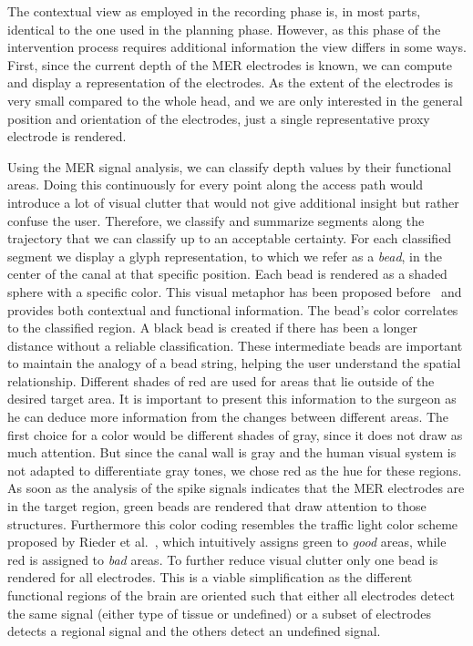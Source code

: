 \documentclass[review]{vgtc}                 %
\begin{document}
The contextual view as employed in the recording phase is, in most parts, identical to the one used in the planning phase. However, as this phase of the intervention process requires additional information the view differs in some ways. First, since the current depth of the MER electrodes is known, we can compute and display a representation of the electrodes. As the extent of the electrodes is very small compared to the whole head, and we are only interested in the general position and orientation of the electrodes, just a single representative proxy electrode is rendered. 

Using the MER signal analysis, we can classify depth values by their functional areas. Doing this continuously for every point along the access path would introduce a lot of visual clutter that would not give additional insight but rather confuse the user. Therefore, we classify and summarize segments along the trajectory that we can classify up to an acceptable certainty. For each classified segment we display a glyph representation, to which we refer as a \emph{bead}, in the center of the canal at that specific position. Each bead is rendered as a shaded sphere with a specific color. This visual metaphor has been proposed before~\cite{Miocinovic2007,Haese2005} and provides both contextual and functional information. The bead's color correlates to the classified region. A black bead is created if there has been a longer distance without a reliable classification. These intermediate beads are important to maintain the analogy of a bead string, helping the user understand the spatial relationship. Different shades of red are used for areas that lie outside of the desired target area. It is important to present this information to the surgeon as he can deduce more information from the changes between different areas. The first choice for a color would be different shades of gray, since it does not draw as much attention. But since the canal wall is gray and the human visual system is not adapted to differentiate gray tones, we chose red as the hue for these regions. As soon as the analysis of the spike signals indicates that the MER electrodes are in the target region, green beads are rendered that draw attention to those structures. Furthermore this color coding resembles the traffic light color scheme proposed by Rieder et al.~\cite{Rieder2010}, which intuitively assigns green to {\it good} areas, while red is assigned to {\it bad} areas. To further reduce visual clutter only one bead is rendered for all electrodes. This is a viable simplification as the different functional regions of the brain are oriented such that either all electrodes detect the same signal (either type of tissue or undefined) or a subset of electrodes detects a regional signal and the others detect an undefined signal.
\end{document}
